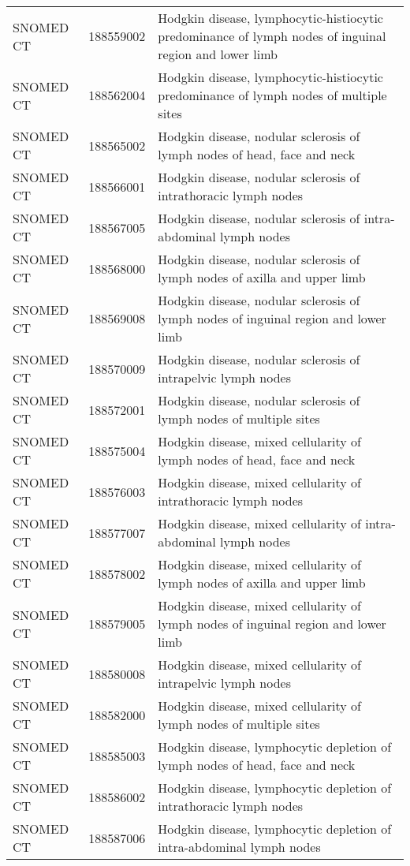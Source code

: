 \begin{longtable}{p{}p{}p{}}
  SNOMED CT & 188559002 & Hodgkin disease, lymphocytic-histiocytic predominance of lymph nodes of inguinal region and lower limb \\ 
  SNOMED CT & 188562004 & Hodgkin disease, lymphocytic-histiocytic predominance of lymph nodes of multiple sites \\ 
  SNOMED CT & 188565002 & Hodgkin disease, nodular sclerosis of lymph nodes of head, face and neck \\ 
  SNOMED CT & 188566001 & Hodgkin disease, nodular sclerosis of intrathoracic lymph nodes \\ 
  SNOMED CT & 188567005 & Hodgkin disease, nodular sclerosis of intra-abdominal lymph nodes \\ 
  SNOMED CT & 188568000 & Hodgkin disease, nodular sclerosis of lymph nodes of axilla and upper limb \\ 
  SNOMED CT & 188569008 & Hodgkin disease, nodular sclerosis of lymph nodes of inguinal region and lower limb \\ 
  SNOMED CT & 188570009 & Hodgkin disease, nodular sclerosis of intrapelvic lymph nodes \\ 
  SNOMED CT & 188572001 & Hodgkin disease, nodular sclerosis of lymph nodes of multiple sites \\ 
  SNOMED CT & 188575004 & Hodgkin disease, mixed cellularity of lymph nodes of head, face and neck \\ 
  SNOMED CT & 188576003 & Hodgkin disease, mixed cellularity of intrathoracic lymph nodes \\ 
  SNOMED CT & 188577007 & Hodgkin disease, mixed cellularity of intra-abdominal lymph nodes \\ 
  SNOMED CT & 188578002 & Hodgkin disease, mixed cellularity of lymph nodes of axilla and upper limb \\ 
  SNOMED CT & 188579005 & Hodgkin disease, mixed cellularity of lymph nodes of inguinal region and lower limb \\ 
  SNOMED CT & 188580008 & Hodgkin disease, mixed cellularity of intrapelvic lymph nodes \\ 
  SNOMED CT & 188582000 & Hodgkin disease, mixed cellularity of lymph nodes of multiple sites \\ 
  SNOMED CT & 188585003 & Hodgkin disease, lymphocytic depletion of lymph nodes of head, face and neck \\ 
  SNOMED CT & 188586002 & Hodgkin disease, lymphocytic depletion of intrathoracic lymph nodes \\ 
  SNOMED CT & 188587006 & Hodgkin disease, lymphocytic depletion of intra-abdominal lymph nodes \\ 

\end{longtable}

